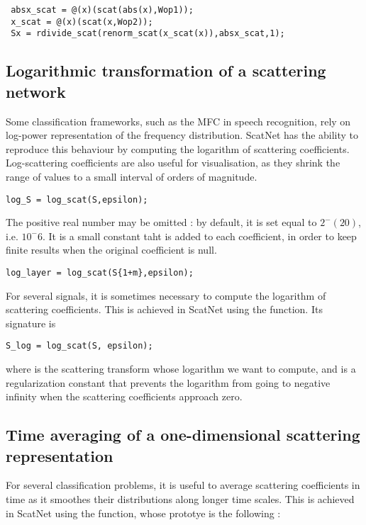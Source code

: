 \documentclass{article}
\begin{document}
\begin{lstlisting}
 absx_scat = @(x)(scat(abs(x),Wop1));
 x_scat = @(x)(scat(x,Wop2));
 Sx = rdivide_scat(renorm_scat(x_scat(x)),absx_scat,1);

\end{lstlisting}


\subsection{Logarithmic transformation of a scattering network}
Some classification frameworks, such as the MFC in speech recognition, rely on log-power representation of the frequency distribution. ScatNet has the ability to reproduce this behaviour by computing the logarithm of scattering coefficients. Log-scattering coefficients are also useful for visualisation, as they shrink the range of values to a small interval of orders of magnitude.

\begin{lstlisting}
log_S = log_scat(S,epsilon);
\end{lstlisting}
The positive real number  may be omitted : by default, it is set equal to $2^-(20)$, i.e. $10^-6$. It is a small constant taht is added to each coefficient, in order to keep finite results when the original coefficient is null.

\begin{lstlisting}
log_layer = log_scat(S{1+m},epsilon);
\end{lstlisting}
For several signals, it is sometimes necessary to compute the logarithm of scattering coefficients. This is achieved in ScatNet using the  function. Its signature is

\begin{lstlisting}
S_log = log_scat(S, epsilon);
\end{lstlisting}
where  is the scattering transform whose logarithm we want to compute, and  is a regularization constant that prevents the logarithm from going to negative infinity when the scattering coefficients approach zero.

\subsection{Time averaging of a one-dimensional scattering representation}

For several classification problems, it is useful to average scattering coefficients in time as it smoothes their distributions along longer time scales. This is achieved in ScatNet using the  function, whose prototye is the following :
\end{document}
